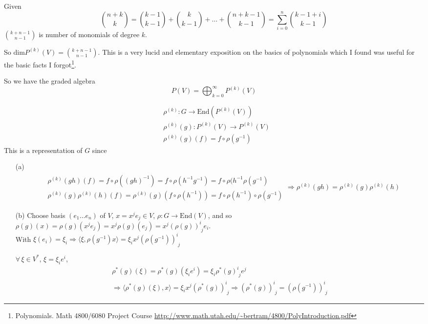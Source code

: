 \documentclass[10pt]{amsart}
\begin{document}
\begin{multicols*}{2}
Given 
\[
\binom{n+k}{k} = \binom{k-1}{k-1} + \binom{k}{k-1} + \dots + \binom{n+k-1}{k-1} = \sum_{i=0}^n \binom{k-1+i}{k-1}
\]
$\binom{k+n-1}{n-1}$ is number of monomials of degree $k$.  

So $\text{dim}P^{(k)}(V) = \binom{k+n-1}{n-1}$.   This is a very lucid and elementary exposition on the basics of polynomials which I found was useful for the basic facts I forgot\footnote{Polynomials. Math 4800/6080 Project Course \url{http://www.math.utah.edu/~bertram/4800/PolyIntroduction.pdf}}.

So we have the graded algebra
\[
P(V) = \bigoplus_{k=0}^{\infty} P^{(k)}(V)
\]

\[
\begin{aligned}
& \rho^{(k)}: G \to \text{End}(P^{(k)}(V)) \\ 
& \rho^{(k)}(g): P^{(k)}(V) \to P^{(k)}(V) \\ 
& \rho^{(k)}(g)(f) = f\circ \rho(g^{-1})
\end{aligned}
\]
This is a representation of $G$ since 
\begin{enumerate}
	\item[(a)] 
	\[
	\begin{gathered}
	\begin{aligned}
	& \rho^{(k)}(gh)(f) = f\circ \rho((gh)^{-1}) = f\circ \rho(h^{-1}g^{-1}) = f\circ \rho(h^{-1}\rho(g^{-1}) \\ 
	& \rho^{(k)}(g) \rho^{(k)}(h)(f) = \rho^{(k)}(g) (f\circ \rho(h^{-1})) = f\circ \rho(h^{-1})\circ \rho(g^{-1})
	\end{aligned} \Longrightarrow \rho^{(k)}(gh) = \rho^{(k)}(g) \rho^{(k)}(h)
	\end{gathered}
	\]
	
	
	\item[(b)]
	Choose basis $(e_1 \dots e_n)$ of $V$, $x = x^j e_j \in V$, $\rho : G \to \text{End}(V)$, and so $\rho(g)(x) = \rho(g)(x^je_j) = x^j\rho(g)(e_j)= x^j(\rho(g))^i_{ \,\, j} e_i$.  \\
	With $\xi(e_i) = \xi_i \Longrightarrow \langle \xi, \rho(g^{-1})x\rangle = \xi_i x^j (\rho(g^{-1}))^i_{ \,\, j}$
	
	$\forall \, \xi \in V^*$, $\xi = \xi_i e^i$, 
	\[
	\begin{gathered}
	\rho^*(g)(\xi) = \rho^*(g)(\xi_i e^i) = \xi_i \rho^*(g)^i_{\,\,j} e^j \\ 
	\Longrightarrow   \langle \rho^*(g)(\xi), x \rangle = \xi_i x^j (\rho^*(g))^i_{ \,\,j} \Longrightarrow (\rho^*(g))^i_{\,\,j} = (\rho(g^{-1}))^i_{ \,\, j} 
	\end{gathered}
	\]
	

\end{enumerate}
\end{multicols*}
\end{document}
